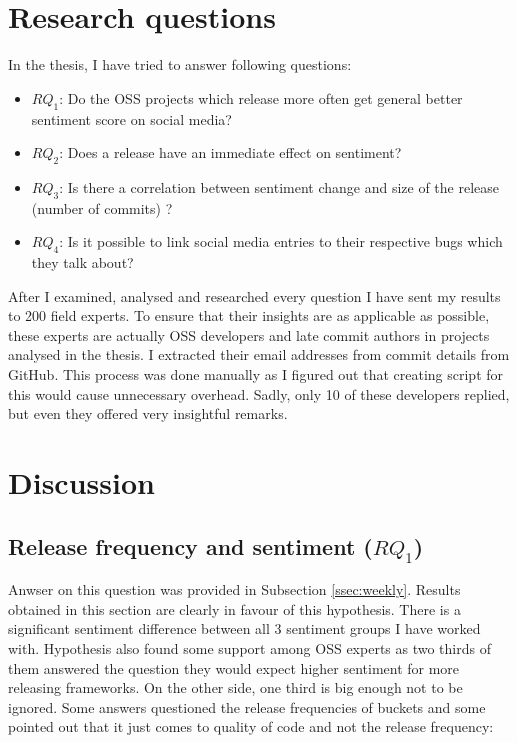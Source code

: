 \section{Research questions}
In the thesis, I have tried to answer following questions:
\begin{itemize}
\item{\textbf{$RQ_{1}$}: Do the OSS projects which release more often get general better sentiment score on social media?}
\item{\textbf{$RQ_{2}$}: Does a release have an immediate effect on sentiment?}
\item{\textbf{$RQ_{3}$}: Is there a correlation between sentiment change and size of the release (number of commits) ?}
\item{\textbf{$RQ_{4}$}: Is it possible to link social media entries to their respective bugs which they talk about?}
\end{itemize}

After I examined, analysed and researched every question I have sent my results to 200 field experts. To ensure that their insights are as applicable as possible, these experts are actually OSS developers and late commit authors in projects analysed in the thesis. I extracted their email addresses from commit details from GitHub. This process was done manually as I figured out that creating script for this would cause unnecessary overhead. Sadly, only 10 of these developers replied, but even they offered very insightful remarks. 

\section{Discussion}
\subsection{Release frequency and sentiment ($RQ_{1}$)}
Anwser on this question was provided in Subsection  \ref{ssec:weekly}. Results obtained in this section are clearly in favour of this hypothesis. There is a significant sentiment difference between all 3 sentiment groups I have worked with. Hypothesis also found some support among OSS experts as two thirds of them answered the question they would expect higher sentiment for more releasing frameworks. On the other side, one third is big enough not to be ignored. Some answers questioned the release frequencies of buckets and some pointed out that it just comes to quality of code and not the release frequency:

